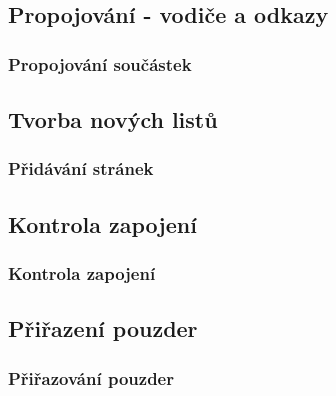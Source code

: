 \documentclass{beamer}
\begin{document}
\subsection{\texorpdfstring{Propojování - vodiče a odkazy}{Propojovani - vodice a odkazy}}
\begin{frame}
	\frametitle{Propojování součástek}
		
\end{frame}


\subsection{\texorpdfstring{Tvorba nových listů}{Tvorba novych listu}}
\begin{frame}
	\frametitle{Přidávání stránek}
		
\end{frame}


\subsection{\texorpdfstring{Kontrola zapojení}{Kontrola zapojeni}}
\begin{frame}
	\frametitle{Kontrola zapojení}
		
\end{frame}


\subsection{\texorpdfstring{Přiřazení pouzder}{Prirazeni pouzder}}
\begin{frame}
	\frametitle{Přiřazování pouzder}
		
\end{frame}

  
\end{document}

